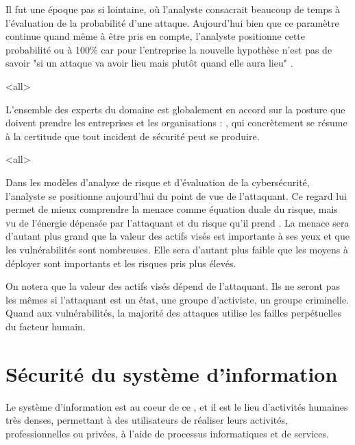 
Il fut une époque pas si lointaine, où l'analyste consacrait beaucoup de temps à l'évaluation de la probabilité d'une attaque. Aujourd'hui bien que ce paramètre continue quand même à être pris en compte, l'analyste positionne cette probabilité ou 
 à 100\% car pour l'entreprise la nouvelle hypothèse n'est pas de savoir "si un attaque va avoir lieu mais plutôt quand elle aura lieu" .



\mode<all>{}

L'ensemble des experts du domaine est globalement en accord sur la posture que doivent prendre les entreprises et les organisations : , qui concrètement se résume à la certitude que tout incident de sécurité peut se produire.

\mode<all>{}

 
Dans les modèles d'analyse de risque et d'évaluation de la cybersécurité, l'analyste se positionne aujourd'hui du point de vue de l'attaquant. Ce regard lui permet de mieux comprendre la menace comme équation duale du risque, mais vu de l'énergie dépensée par l'attaquant et du risque qu'il prend . La menace sera d'autant plus grand que la valeur des actifs visés est importante à ses yeux et que les vulnérabilités sont nombreuses. Elle sera d'autant plus faible que les moyens à déployer sont importants et les risques pris plus élevés.

On notera que la valeur des actifs visés dépend de l'attaquant. Ils ne seront pas les mêmes si l'attaquant est un état, une groupe d'activiste, un groupe criminelle.
Quand aux vulnérabilités, la majorité des attaques utilise les failles perpétuelles du facteur humain.




\section{Sécurité du système d'information}

Le système d'information est au coeur de ce , et il est le lieu d'activités humaines très denses, permettant à des utilisateurs de réaliser leurs activités, professionnelles ou privées, à l'aide de processus informatiques et de services. 

